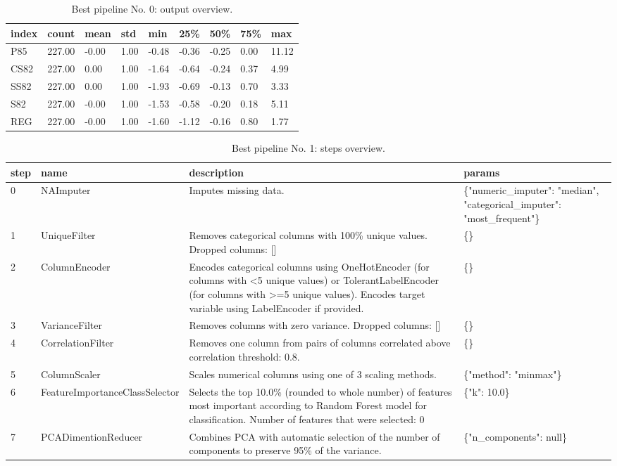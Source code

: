\documentclass{article}%
\begin{document}
%


\begin{table}[H]%
\begin{center}%
\renewcommand{\arraystretch}{1.5}%
\begin{tabular}{l l l l l l l l l}%
\hline%
\textbf{index}&\textbf{count}&\textbf{mean}&\textbf{std}&\textbf{min}&\textbf{25\%}&\textbf{50\%}&\textbf{75\%}&\textbf{max}\\%
\hline%
P85&227.00&{-}0.00&1.00&{-}0.48&{-}0.36&{-}0.25&0.00&11.12\\%
CS82&227.00&0.00&1.00&{-}1.64&{-}0.64&{-}0.24&0.37&4.99\\%
SS82&227.00&0.00&1.00&{-}1.93&{-}0.69&{-}0.13&0.70&3.33\\%
S82&227.00&{-}0.00&1.00&{-}1.53&{-}0.58&{-}0.20&0.18&5.11\\%
REG&227.00&{-}0.00&1.00&{-}1.60&{-}1.12&{-}0.16&0.80&1.77\\%
\hline%
\end{tabular}%
\end{center}%
\caption{Best pipeline No. 0: output overview.}%
\end{table}

%


\begin{table}[H]%
\begin{center}%
\renewcommand{\arraystretch}{1.5}%
\begin{tabular}{p{7mm} p{50mm} p{80mm} p{40mm}}%
\hline%
\textbf{step}&\textbf{name}&\textbf{description}&\textbf{params}\\%
\hline%
0&NAImputer&Imputes missing data.&\{"numeric\_imputer": "median", "categorical\_imputer": "most\_frequent"\}\\%
1&UniqueFilter&Removes categorical columns with 100\% unique values. Dropped columns: {[}{]}&\{\}\\%
2&ColumnEncoder&Encodes categorical columns using OneHotEncoder (for columns with <5 unique values) or TolerantLabelEncoder (for columns with >=5 unique values). Encodes target variable using LabelEncoder if provided.&\{\}\\%
3&VarianceFilter&Removes columns with zero variance. Dropped columns: {[}{]}&\{\}\\%
4&CorrelationFilter&Removes one column from pairs of columns correlated above correlation threshold: 0.8.&\{\}\\%
5&ColumnScaler&Scales numerical columns using one of 3 scaling methods.&\{"method": "minmax"\}\\%
6&FeatureImportanceClassSelector&Selects the top 10.0\% (rounded to whole number) of features most important according to Random Forest model for classification. Number of features that were selected: 0&\{"k": 10.0\}\\%
7&PCADimentionReducer&Combines PCA with automatic selection of the number of components to preserve 95\% of the variance.&\{"n\_components": null\}\\%
\hline%
\end{tabular}%
\end{center}%
\caption{Best pipeline No. 1: steps overview.}%
\end{table}
\end{document}
